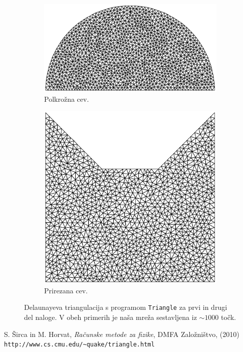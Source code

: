 \documentclass[a4 paper, 12pt]{article}
\begin{document}
\begin{figure}[H]\centering
	\begin{subfigure}[b]{0.57\textwidth}
		\includegraphics[width=\textwidth, keepaspectratio=1]{semicircle.pdf}
		\caption{Polkro\v zna cev.}
	\end{subfigure}
	\begin{subfigure}[b]{0.40\textwidth}
		\includegraphics[width=\textwidth, keepaspectratio=1]{batman.pdf}
		\caption{Prirezana cev.}
	\end{subfigure}
	\caption{Delaunayeva triangulacija s programom \texttt{Triangle} za prvi in drugi del naloge.
		V obeh primerih je na\v sa mre\v za sestavljena iz $\sim 1000$ to\v ck.}
\end{figure}

\begin{thebibliography}{9}
		S. \v Sirca in M. Horvat,
		{\em Ra\v cunske metode za fizike},
		DMFA Zalo\v zni\v stvo,
		(2010)
		{\tt http://www.cs.cmu.edu/\~{}quake/triangle.html}
\end{thebibliography}
\end{document}
